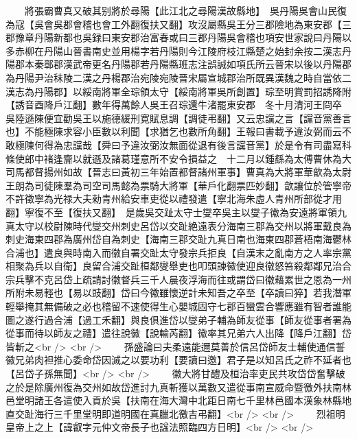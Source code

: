 　　將張霸曹真又破其别將於尋陽【此江北之尋陽漢故縣地】　吳丹陽吳會山民復為寇【吳會吳郡會稽也會工外翻復扶又翻】攻沒屬縣吳王分三郡險地為東安郡【三郡豫章丹陽新都也吳録曰東安郡治富春或曰三郡丹陽吳會稽也項安世家說曰丹陽以多赤柳在丹陽山晉書南史並用楊字若丹陽則今江陵府枝江縣楚之始封余按二漢志丹陽郡本秦鄣郡漢武帝更名丹陽郡若丹陽縣班志注誤誠如項氏所云晉宋以後以丹陽郡為丹陽尹治秣陵二漢之丹楊郡治宛陵宛陵晉宋屬宣城郡治所既異漢魏之時自當依二漢志為丹陽郡】以綏南將軍全琮領太守【綏南將軍吳所創置】琮至明賞罰招誘降附【誘音酉降戶江翻】數年得萬餘人吳王召琮還牛渚罷東安郡　冬十月清河王冏卒　吳陸遜陳便宜勸吳王以施德緩刑寛賦息調【調徒弔翻】又云忠讜之言【讜音黨善言也】不能極陳求容小臣數以利聞【求猶乞也數所角翻】王報曰書載予違汝弼而云不敢極陳何得為忠讜哉【舜曰予違汝弼汝無面從退有後言讜音黨】於是令有司盡寫科條使郎中禇逢齎以就遜及諸葛瑾意所不安令損益之　十二月以鍾繇為太傅曹休為大司馬都督揚州如故【晉志曰黃初三年始置都督諸州軍事】曹真為大將軍華歆為太尉王朗為司徒陳羣為司空司馬懿為票騎大將軍【華戶化翻票匹妙翻】歆讓位於管寧帝不許徵寧為光禄大夫勑青州給安車吏從以禮發遣【寧北海朱虛人青州所部從才用翻】寧復不至【復扶又翻】　是歲吳交趾太守士燮卒吳主以燮子徽為安遠將軍領九真太守以校尉陳時代燮交州刺史呂岱以交趾絶遠表分海南三郡為交州以將軍戴良為刺史海東四郡為廣州岱自為刺史【海南三郡交趾九真日南也海東四郡蒼梧南海鬱林合浦也】遣良與時南入而徽自署交趾太守發宗兵拒良【自漢末之亂南方之人率宗黨相聚為兵以自衛】良留合浦交趾桓鄰燮舉吏也叩頭諫徽使迎良徽怒笞殺鄰鄰兄治合宗兵擊不克呂岱上疏請討徽督兵三千人晨夜浮海而往或謂岱曰徽藉累世之恩為一州所附未易輕也【易以豉翻】岱曰今徽雖懷逆計未知吾之卒至【卒讀曰猝】若我潛軍輕舉掩其無備破之必也稽留不速使得生心嬰城固守七郡百蠻雲合響應雖有智者誰能圖之遂行過合浦【過工禾翻】與良俱進岱以燮弟子輔為師友從事【師友從事者署為從事而待以師友之禮】遣往說徽【說輸芮翻】徽率其兄弟六人出降【降戶江翻】岱皆斬之<br />
<br />
　　孫盛論曰夫柔遠能邇莫善於信呂岱師友士輔使通信誓徽兄弟肉袒推心委命岱因滅之以要功利【要讀曰邀】君子是以知呂氏之祚不延者也【呂岱子孫無聞】<br />
<br />
　　徽大將甘醴及桓治率吏民共攻岱岱奮擊破之於是除廣州復為交州如故岱進討九真斬獲以萬數又遣從事南宣威命暨徼外扶南林邑堂明諸王各遣使入貢於吳【扶南在海大灣中北距日南七千里林邑國本漢象林縣地直交趾海行三千里堂明即道明國在真臘北徼吉弔翻】<br />
<br />
　　烈祖明皇帝上之上【諱叡字元仲文帝長子也諡法照臨四方日明】<br />
<br />
